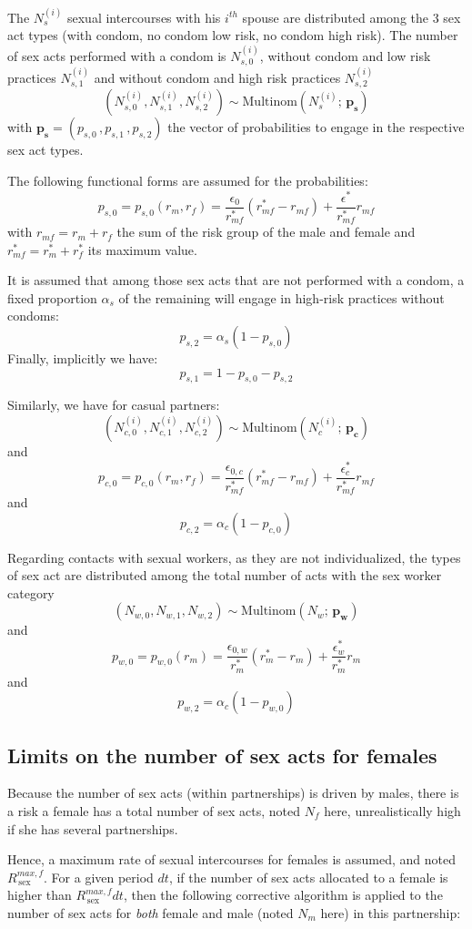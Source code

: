 \documentclass[11pt, onecolumn]{article}
\begin{document}
The $N^{(i)}_s$ sexual intercourses with his $i^{th}$ spouse are distributed among the 3 sex act types (with condom, no condom low risk, no condom high risk). The number of sex acts performed with a condom is $N^{(i)}_{s,0}$, without condom and low risk practices $N^{(i)}_{s,1}$ and without condom and high risk practices $N^{(i)}_{s,2}$
$$\left(N^{(i)}_{s,0},N^{(i)}_{s,1},N^{(i)}_{s,2}\right) \sim \mathrm{Multinom}(N^{(i)}_s;\, \mathbf{p_s}) $$
with $\mathbf{p_s}=(p_{s,0}\,,p_{s,1}\,,p_{s,2})$ the vector of probabilities to engage in the respective sex act types.

The following functional forms are assumed for the probabilities:
$$p_{s,0}=p_{s,0} (r_m,r_f) = \frac{\epsilon_0}{r_{mf}^*}(r_{mf}^*-r_{mf}) + \frac{\epsilon^*}{r_{mf}^*}r_{mf}$$ 
with $r_{mf} = r_m+r_f$ the sum of the risk group of the male and female and $r_{mf}^* = r_m^*+r_f^*$ its maximum value.

It is assumed that among those sex acts that are not performed with a condom, a fixed proportion $\alpha_s$ of the remaining will engage in high-risk practices without condoms:
$$p_{s,2} = \alpha_s (1-p_{s,0})$$ 
Finally, implicitly we have:
$$p_{s,1} = 1-p_{s,0}-p_{s,2}$$ 

Similarly, we have for casual partners:
$$\left(N^{(i)}_{c,0},N^{(i)}_{c,1},N^{(i)}_{c,2}\right) \sim \mathrm{Multinom}(N^{(i)}_c;\, \mathbf{p_c}) $$
and 
$$p_{c,0}=p_{c,0} (r_m,r_f) = \frac{\epsilon_{0,c}}{r_{mf}^*}(r_{mf}^*-r_{mf}) + \frac{\epsilon_c^*}{r_{mf}^*}r_{mf}$$ 
and
$$p_{c,2} = \alpha_c (1-p_{c,0})$$ 

Regarding contacts with sexual workers, as they are not individualized, the types of sex act are distributed among the total number of acts with the sex worker category
$$\left(N_{w,0},N_{w,1},N_{w,2}\right) \sim \mathrm{Multinom}(N_w;\, \mathbf{p_w}) $$
and
$$p_{w,0}=p_{w,0} (r_m) = \frac{\epsilon_{0,w}}{r_{m}^*}(r_{m}^*-r_{m}) + \frac{\epsilon_w^*}{r_{m}^*}r_{m}$$ 
and
$$p_{w,2} = \alpha_c (1-p_{w,0})$$ 



\subsection{Limits on the number of sex acts for females}
Because the number of sex acts (within partnerships) is driven by males, there is a risk a female has a total number of sex acts, noted $N_f$ here, unrealistically high if she has several partnerships.

Hence, a maximum rate of sexual intercourses for females is assumed, and noted $R_{\mathrm{\,sex}}^{max,f}$. For a given period $dt$, if the number of sex acts allocated to a female is higher than $R_{\mathrm{\,sex}}^{max,f}dt$, then the following corrective algorithm is applied to the number of sex acts for \emph{both} female and male (noted $N_m$ here) in this partnership:
\end{document}
